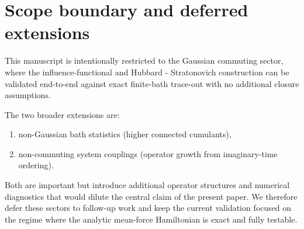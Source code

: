 \section{Scope boundary and deferred extensions}
\label{sec:beyond_gaussian}

This manuscript is intentionally restricted to the Gaussian commuting sector,
where the influence-functional and Hubbard - Stratonovich construction can be
validated end-to-end against exact finite-bath trace-out with no additional
closure assumptions.

The two broader extensions are:
\begin{enumerate}
\item non-Gaussian bath statistics (higher connected cumulants),
\item non-commuting system couplings (operator growth from imaginary-time ordering).
\end{enumerate}
Both are important but introduce additional operator structures and numerical
diagnostics that would dilute the central claim of the present paper. We
therefore defer these sectors to follow-up work and keep the current validation
focused on the regime where the analytic mean-force Hamiltonian is exact and
fully testable.
